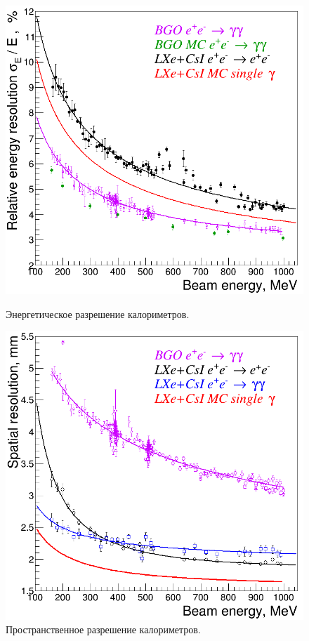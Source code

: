 \begin{figure}[htbp]
    \begin{minipage}[t]{0.475\textwidth}
        \centering
        \includegraphics[width=\textwidth]{img/cmd3_detector/comb_energy_resolution.png}
        \caption{Энергетическое разрешение калориметров.}\label{fig:cal_energy_resolution}
    \end{minipage}
    \hfill
    \begin{minipage}[t]{0.475\textwidth}
        \centering
        \includegraphics[width=\textwidth]{img/cmd3_detector/comb_spatial_resolution.png}
        \caption{Пространственное разрешение калориметров.}\label{fig:cal_spatial_resolution}
  \end{minipage}
\end{figure}



